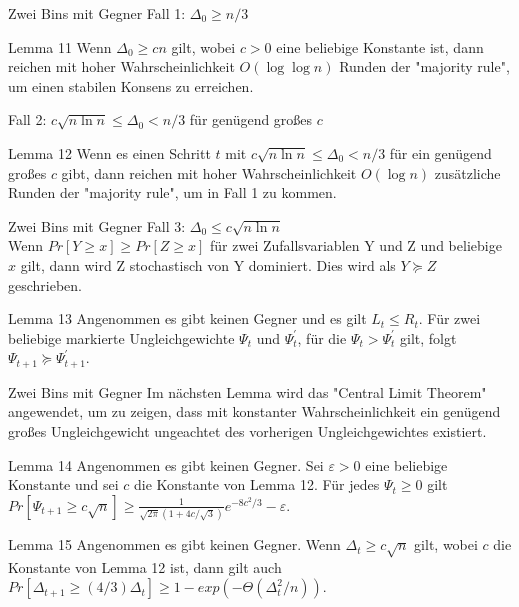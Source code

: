\documentclass{beamer}
\begin{document}
    \begin{frame}{Zwei Bins mit Gegner}
        Fall 1: \(\Delta_0 \geq n/3\)

        \begin{block}{Lemma 11}
            Wenn \(\Delta_0 \geq cn\) gilt, wobei \(c > 0\) eine beliebige Konstante
            ist, dann reichen mit hoher Wahrscheinlichkeit \(O(\log \log n)\)
            Runden der "majority rule", um einen stabilen Konsens zu erreichen.
        \end{block}

        Fall 2: \(c \sqrt{n \ln n} \leq \Delta_0 < n/3\) für genügend großes \(c\)
        \begin{block}{Lemma 12}
            Wenn es einen Schritt \(t\) mit \(c\sqrt{n\ln n} \leq \Delta_0 < n/3\)
            für ein genügend großes \(c\) gibt, dann reichen mit hoher Wahrscheinlichkeit
            \(O(\log n)\) zusätzliche Runden der "majority rule", um in Fall 1
            zu kommen.
        \end{block}
    \end{frame}

    \begin{frame}{Zwei Bins mit Gegner}
        Fall 3: \(\Delta_0 \leq c\sqrt{n \ln n}\)\\
        Wenn \(Pr[Y \geq x] \geq Pr[Z \geq x]\) für zwei Zufallsvariablen Y und Z
        und beliebige \(x\) gilt, dann wird Z stochastisch von Y dominiert. Dies
        wird als \(Y \succeq Z\) geschrieben.
        \begin{block}{Lemma 13}
            Angenommen es gibt keinen Gegner und es gilt \(L_t \leq R_t \). Für
            zwei beliebige markierte Ungleichgewichte \(\Psi_t\) und \(\Psi_t^{'}\),
            für die \(\Psi_t > \Psi_t^{'}\) gilt, folgt
            \(\Psi_{t+1} \succeq \Psi_{t+1}^{'}\).
        \end{block}
    \end{frame}

    \begin{frame}{Zwei Bins mit Gegner}
        Im nächsten Lemma wird das "Central Limit Theorem" angewendet, um zu zeigen,
        dass mit konstanter Wahrscheinlichkeit ein genügend großes Ungleichgewicht
        ungeachtet des vorherigen Ungleichgewichtes existiert.

        \begin{block}{Lemma 14}
            Angenommen es gibt keinen Gegner. Sei \(\varepsilon > 0\) eine beliebige
            Konstante und sei \(c\) die Konstante von Lemma 12. Für jedes
            \(\Psi_t \geq 0\) gilt
            \(Pr[\Psi_{t+1} \geq c\sqrt{n}] \geq \frac{1}{\sqrt{2\pi}(1 + 4c/\sqrt{3})}e^{-8c^{2}/3}-\varepsilon\).
        \end{block}
        \begin{block}{Lemma 15}
            Angenommen es gibt keinen Gegner. Wenn \(\Delta_t \geq c\sqrt{n}\) gilt,
            wobei \(c\) die Konstante von Lemma 12 ist, dann gilt auch
            \(Pr[\Delta_{t+1} \geq (4/3)\Delta_t] \geq 1 - exp(-\Theta(\Delta^2_t / n))\).
        \end{block}
    \end{frame}
\end{document}
